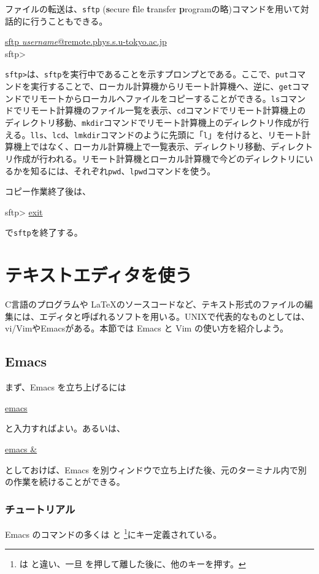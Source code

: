ファイルの転送は、{\tt sftp} ({\bf s}ecure {\bf f}ile {\bf t}ransfer {\bf p}rogramの略)コマンドを用いて対話的に行うこともできる。
\begin{commandline2}
\prompt \underline{sftp {\it username}@remote.phys.s.u-tokyo.ac.jp} \\
sftp>
\end{commandline2} \noindent
\verb|sftp>|は、{\tt sftp}を実行中であることを示すプロンプとである。ここで、{\tt put}コマンドを実行することで、ローカル計算機からリモート計算機へ、逆に、{\tt get}コマンドでリモートからローカルへファイルをコピーすることができる。{\tt ls}コマンドでリモート計算機のファイル一覧を表示、{\tt cd}コマンドでリモート計算機上のディレクトリ移動、{\tt mkdir}コマンドでリモート計算機上のディレクトリ作成が行える。{\tt lls}、{\tt lcd}、{\tt lmkdir}コマンドのように先頭に「{\tt l}」を付けると、リモート計算機上ではなく、ローカル計算機上で一覧表示、ディレクトリ移動、ディレクトリ作成が行われる。リモート計算機とローカル計算機で今どのディレクトリにいるかを知るには、それぞれ{\tt pwd}、{\tt lpwd}コマンドを使う。

コピー作業終了後は、
\begin{commandline2}
sftp> \underline{exit}
\end{commandline2} \noindent
で{\tt sftp}を終了する。

\section{テキストエディタを使う}

C言語のプログラムや \LaTeX のソースコードなど、テキスト形式のファイルの編集には、エディタと呼ばれるソフトを用いる。UNIXで代表的なものとしては、vi/VimやEmacsがある。本節では Emacs と Vim の使い方を紹介しよう。

\subsection{Emacs}

まず、Emacs を立ち上げるには
\begin{commandline2}
\prompt \underline{emacs}
\end{commandline2} \noindent
と入力すればよい。あるいは、
\begin{commandline2}
\prompt \underline{emacs \&}
\end{commandline2} \noindent
としておけば、Emacs を別ウィンドウで立ち上げた後、元のターミナル内で別の作業を続けることができる。
\subsubsection{チュートリアル}
Emacs のコマンドの多くは
 と \footnote{ は  と違い、一旦  を押して離した後に、他のキーを押す。}にキー定義されている。

